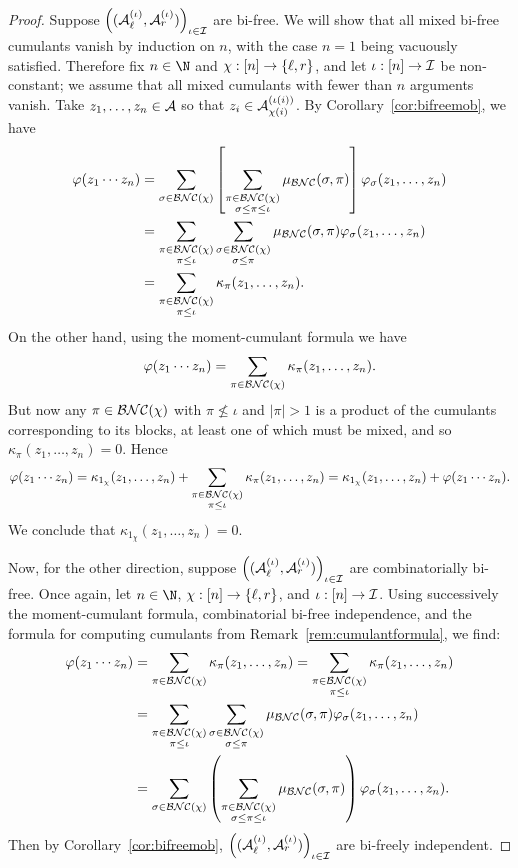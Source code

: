 \begin{proof}
	Suppose $\left((\mathcal{A}_\ell^{(\iota)}, \mathcal{A}_r^{(\iota)})\right)_{\iota\in\mathcal{I}}$ are bi-free.
	We will show that all mixed bi-free cumulants vanish by induction on $n$, with the case $n=1$ being vacuously satisfied.
	Therefore fix $n\in\N$ and $\chi : [n] \to \left\{\ell, r\right\}$, and let $\iota : [n]\to\mathcal{I}$ be non-constant; we assume that all mixed cumulants with fewer than $n$ arguments vanish.
	Take $z_1, \ldots, z_n \in \mathcal{A}$ so that $z_i \in \mathcal{A}_{\chi(i)}^{(\iota(i))}$.
	By Corollary~\ref{cor:bifreemob}, we have
	\begin{align*}
		\varphi(z_1\cdots z_n)
		&= \sum_{\sigma \in \mathcal{BNC}(\chi)}\left[\sum_{\substack{\pi \in \mathcal{BNC}(\chi) \\ \sigma \leq \pi \leq \iota}} \mu_{\mathcal{BNC}}(\sigma, \pi)\right] \varphi_\sigma(z_1, \ldots, z_n) \\
		&= \sum_{\substack{\pi \in \mathcal{BNC}(\chi) \\ \pi \leq \iota}} \sum_{\substack{\sigma\in \mathcal{BNC}(\chi) \\ \sigma \leq \pi}} \mu_{\mathcal{BNC}}(\sigma, \pi)\varphi_\sigma(z_1, \ldots, z_n) \\
		&= \sum_{\substack{\pi \in \mathcal{BNC}(\chi) \\ \pi \leq \iota}} \kappa_\pi(z_1, \ldots, z_n).
	\end{align*}
	On the other hand, using the moment-cumulant formula we have
	$$
	\varphi(z_1\cdots z_n)
	= \sum_{\pi\in\mathcal{BNC}(\chi)} \kappa_\pi(z_1, \ldots, z_n).
	$$
	But now any $\pi \in \mathcal{BNC}(\chi)$ with $\pi \nleq \iota$ and $|\pi| > 1$ is a product of the cumulants corresponding to its blocks, at least one of which must be mixed, and so $\kappa_\pi(z_1, \ldots, z_n) = 0$.
	Hence
	$$
	\varphi(z_1\cdots z_n)
	= \kappa_{1_\chi}(z_1, \ldots, z_n) + \sum_{\substack{\pi \in \mathcal{BNC}(\chi) \\ \pi \leq \iota}} \kappa_\pi(z_1, \ldots, z_n)
	= \kappa_{1_\chi}(z_1, \ldots, z_n) + \varphi(z_1\cdots z_n).
	$$
	We conclude that $\kappa_{1_\chi}(z_1, \ldots, z_n) = 0$.

	Now, for the other direction, suppose $\left((\mathcal{A}_\ell^{(\iota)}, \mathcal{A}_r^{(\iota)})\right)_{\iota\in\mathcal{I}}$ are combinatorially bi-free.
	Once again, let $n \in \N$, $\chi : [n]\to\left\{\ell, r\right\}$, and $\iota: [n] \to \mathcal{I}$.
	Using successively the moment-cumulant formula, combinatorial bi-free independence, and the formula for computing cumulants from Remark~\ref{rem:cumulantformula}, we find:
	\begin{align*}
		\varphi(z_1\cdots z_n)
		&= \sum_{\pi \in \mathcal{BNC}(\chi)} \kappa_\pi(z_1, \ldots, z_n)
		= \sum_{\substack{\pi\in\mathcal{BNC}(\chi) \\ \pi \leq \iota}} \kappa_\pi(z_1, \ldots, z_n) \\
		&= \sum_{\substack{\pi\in\mathcal{BNC}(\chi) \\ \pi \leq \iota}} \sum_{\substack{\sigma\in\mathcal{BNC}(\chi) \\ \sigma\leq\pi}} \mu_{\mathcal{BNC}}(\sigma, \pi)\varphi_\sigma(z_1, \ldots, z_n) \\
		&= \sum_{\sigma \in \mathcal{BNC}(\chi)}\left(\sum_{\substack{\pi \in \mathcal{BNC}(\chi) \\ \sigma\leq\pi\leq\iota}} \mu_{\mathcal{BNC}}(\sigma, \pi)\right) \varphi_\sigma(z_1, \ldots, z_n).
	\end{align*}
	Then by Corollary~\ref{cor:bifreemob}, $\left((\mathcal{A}_\ell^{(\iota)}, \mathcal{A}_r^{(\iota)})\right)_{\iota\in\mathcal{I}}$ are bi-freely independent.
\end{proof}

